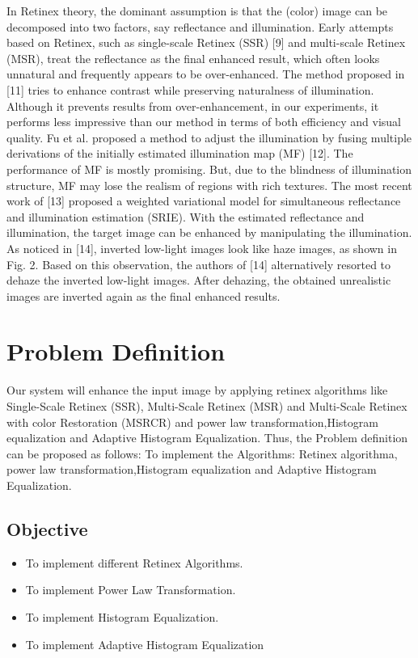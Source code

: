 In Retinex theory, the dominant assumption is that the (color) image can be decomposed into two factors,
say reflectance and illumination. Early attempts based on Retinex, such as single-scale Retinex (SSR) [9] and multi-scale Retinex (MSR), treat the reflectance as the final enhanced result, which often looks unnatural and frequently appears to be over-enhanced. The method proposed in [11] tries to enhance contrast while preserving naturalness of illumination. Although it prevents results from over-enhancement, in our experiments, it performs less impressive than our method in terms of both efficiency and visual quality. Fu et al. proposed a method to adjust the illumination by fusing multiple derivations of the initially estimated illumination map (MF) [12]. The performance of MF is mostly promising. But, due to the blindness of illumination structure, MF may lose the realism of regions with rich textures. The most recent work of [13] proposed a weighted variational model for simultaneous reflectance and illumination estimation (SRIE). With the estimated reflectance and illumination, the target image can be enhanced by manipulating the illumination. As noticed in [14], inverted low-light images look like haze images, as shown in Fig. 2. Based on this observation, the authors of [14] alternatively resorted to dehaze the inverted low-light images. After dehazing, the obtained unrealistic images are inverted again as the final enhanced results.


\section{Problem Definition}
Our system will enhance the input image by applying retinex algorithms like Single-Scale Retinex (SSR), Multi-Scale Retinex (MSR) and Multi-Scale Retinex with color Restoration (MSRCR) and power law transformation,Histogram equalization and Adaptive Histogram Equalization. Thus, the Problem definition can be proposed as follows: To implement the Algorithms: Retinex algorithma, power law transformation,Histogram equalization and Adaptive Histogram Equalization.
\subsection{Objective}
	\begin{itemize}
		\item To implement different Retinex Algorithms.
		\item To implement Power Law Transformation.
		\item To implement Histogram Equalization.
		\item To implement Adaptive Histogram Equalization
	\end{itemize}

